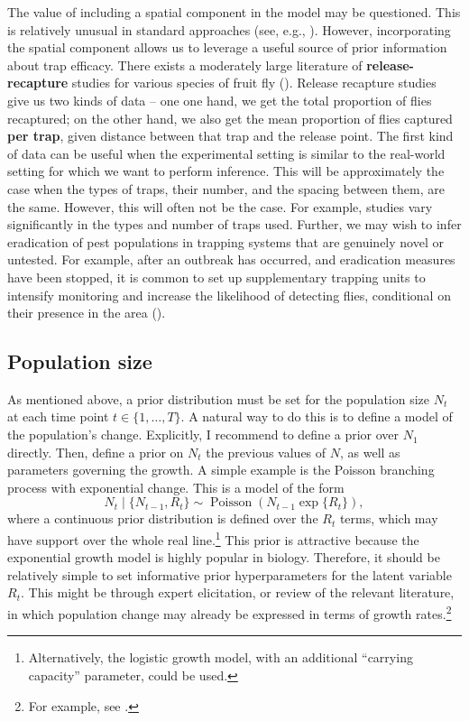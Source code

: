 \documentclass[
]{book}
\begin{document}
The value of including a spatial component in the model may be questioned. This is relatively unusual in standard approaches (see, e.g., \citet{mcardle1990}). However, incorporating the spatial component allows us to leverage a useful source of prior information about trap efficacy. There exists a moderately large literature of \textbf{release-recapture} studies for various species of fruit fly (\citet{todocite}). Release recapture studies give us two kinds of data -- one one hand, we get the total proportion of flies recaptured; on the other hand, we also get the mean proportion of flies captured \textbf{per trap}, given distance between that trap and the release point. The first kind of data can be useful when the experimental setting is similar to the real-world setting for which we want to perform inference. This will be approximately the case when the types of traps, their number, and the spacing between them, are the same. However, this will often not be the case. For example, studies vary significantly in the types and number of traps used. Further, we may wish to infer eradication of pest populations in trapping systems that are genuinely novel or untested. For example, after an outbreak has occurred, and eradication measures have been stopped, it is common to set up supplementary trapping units to intensify monitoring and increase the likelihood of detecting flies, conditional on their presence in the area (\citet{supp_traps}).

\hypertarget{population-size}{%
\subsection{Population size}\label{population-size}}

As mentioned above, a prior distribution must be set for the population size \(N_t\) at each time point \(t \in \{1, \ldots, T\}\). A natural way to do this is to define a model of the population's change. Explicitly, I recommend to define a prior over \(N_1\) directly. Then, define a prior on \(N_t\) the previous values of \(N\), as well as parameters governing the growth. A simple example is the Poisson branching process with exponential change. This is a model of the form
\[
N_t \mid \{N_{t-1}, R_t\} \sim \operatorname{Poisson}(N_{t-1} \exp \{R_t\}),
\]
where a continuous prior distribution is defined over the \(R_t\) terms, which may have support over the whole real line.\footnote{Alternatively, the logistic growth model, with an additional ``carrying capacity'' parameter, could be used.} This prior is attractive because the exponential growth model is highly popular in biology. Therefore, it should be relatively simple to set informative prior hyperparameters for the latent variable \(R_t\). This might be through expert elicitation, or review of the relevant literature, in which population change may already be expressed in terms of growth rates.\footnote{For example, see \citet{papadopoulos2002}.}
\end{document}
